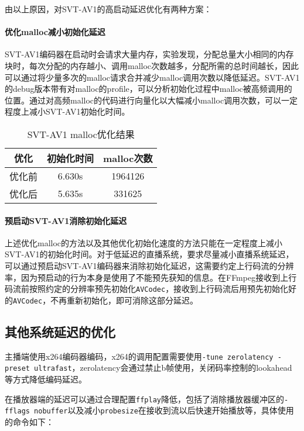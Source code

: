   由以上原因，对SVT-AV1的高启动延迟优化有两种方案：

  \paragraph{优化malloc减小初始化延迟} SVT-AV1编码器在启动时会请求大量内存，实验发现，分配总量大小相同的内存块时，每次分配的内存越小、调用malloc次数越多，分配所需的总时间越长，因此可以通过将少量多次的malloc请求合并减少malloc调用次数以降低延迟。SVT-AV1的debug版本带有对malloc的profile，可以分析初始化过程中malloc被高频调用的位置。通过对高频malloc的代码进行向量化以大幅减小malloc调用次数，可以一定程度上减小SVT-AV1初始化时间。

  \begin{table}[!hpt]
    \caption{SVT-AV1 malloc优化结果}
    \label{tab:malloc}
    \centering
    \begin{tabular}{ccc} \toprule
      优化    & 初始化时间 & malloc次数\\ \midrule
      优化前  & 6.630s   & 1964126  \\
      优化后  & 5.635s   & 331625   \\ \bottomrule
    \end{tabular}
  \end{table}

  \paragraph{预启动SVT-AV1消除初始化延迟} 上述优化malloc的方法以及其他优化初始化速度的方法只能在一定程度上减小SVT-AV1的初始化时间。对于低延迟的直播系统，要求尽量减小直播系统延迟，可以通过预启动SVT-AV1编码器来消除初始化延迟，这需要约定上行码流的分辨率，因为预启动的行为本身是使用了不能预先获知的信息。在FFmpeg接收到上行码流前按照约定的分辨率预先初始化\texttt{AVCodec}，接收到上行码流后用预先初始化好的\texttt{AVCodec}，不再重新初始化，即可消除这部分延迟。

	\subsection{其他系统延迟的优化}

	主播端使用x264编码器编码，x264的调用配置需要使用\texttt{-tune zerolatency -preset ultrafast}，zerolatency会通过禁止b帧使用，关闭码率控制的lookahead等方式降低编码延迟。

	在播放器端的延迟可以通过合理配置\texttt{ffplay}降低，包括了消除播放器缓冲区的\texttt{-fflags nobuffer}以及减小\texttt{probesize}在接收到流以后快速开始播放等，具体使用的命令如下：

